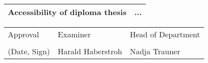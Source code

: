 \begin{center}
    \vspace{5mm}
    
    \begin{tabular}{| m{8cm} | m{8cm} |}
        \hline
        Accessibility of diploma thesis & ...\\ %
        \hline
    \end{tabular}
    
    \vspace{5mm}
    
    \begin{tabular}{| m{5cm} | m{6cm} | m{5cm} |}
        \hline
        Approval & Examiner & Head of Department\\
        &&\\
        (Date, Sign) & Harald Haberstroh & Nadja Trauner\\ %
        \hline
    \end{tabular}
    
    \end{center}